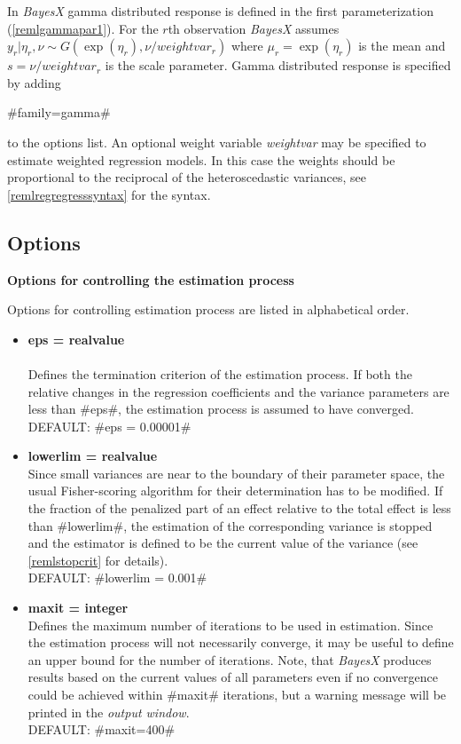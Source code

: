 In {\em BayesX} gamma distributed response is defined in the first
parameterization (\ref{remlgammapar1}). For the $r$th observation
{\em BayesX} assumes  $y_r | \eta_r,\nu \sim
G(\exp(\eta_r),\nu/weightvar_r)$ where $\mu_r = \exp(\eta_r)$ is
the mean and $s=\nu/weightvar_r$ is the scale parameter. Gamma
distributed response is specified by adding

#family=gamma#

to the options list. An optional weight variable {\em weightvar}
may be specified to estimate weighted regression models. In this
case the weights should be proportional to the reciprocal of the
heteroscedastic variances, see \autoref{remlregregresssyntax} for
the syntax.

\subsection{Options}
\label{remlregregressoptions}

\vspace{0.4cm}

{\bf Options for controlling the estimation process}
\label{remlest_options}

Options for controlling estimation process are listed in
alphabetical order.

\begin{itemize}
\item {\bf eps = realvalue } \\
\\Defines the termination criterion of the estimation process. If
both the relative changes in the regression coefficients and the
variance parameters are less than #eps#, the estimation process is
assumed to have converged.\\
DEFAULT: #eps = 0.00001#

\item {\bf lowerlim = realvalue } \\
Since small variances are near to the boundary of their parameter
space, the usual Fisher-scoring algorithm for their determination
has to be modified. If the fraction of the penalized part of an
effect relative to the total effect is less than #lowerlim#, the
estimation of the corresponding variance is stopped and the
estimator is defined to be the current value of the variance (see
\autoref{remlstopcrit} for details).\\
DEFAULT: #lowerlim = 0.001#

\item {\bf maxit = integer } \\
Defines the maximum number of iterations to be used in estimation.
Since the estimation process will not necessarily converge, it may
be useful to define an upper bound for the number of iterations.
Note, that {\it BayesX} produces results based on the current
values of all parameters even if no convergence could be achieved
within #maxit# iterations, but a warning message will be printed
in the {\it output window}.\\
DEFAULT: #maxit=400#

\end{itemize}

